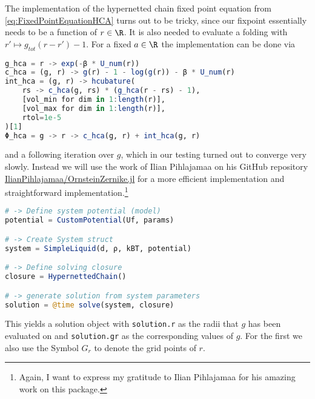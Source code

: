 The implementation of the hypernetted chain fixed point equation from \eqref{eq:FixedPointEquationHCA} turns out to be tricky, since our fixpoint essentially needs to be a function of $r\in\R$. It is also needed to evaluate a folding with $r'\mapsto g_{\textit{tot}}(r - r')-1$. For a fixed $a\in\R$ the implementation can be done via
\begin{mdframed}[backgroundcolor=black!4, topline=false, bottomline=false, rightline=false, leftline=false]
    \begin{lstlisting}[language=Julia,basicstyle=\small]
g_hca = r -> exp(-β * U_num(r))
c_hca = (g, r) -> g(r) - 1 - log(g(r)) - β * U_num(r)
int_hca = (g, r) -> hcubature(
    rs -> c_hca(g, rs) * (g_hca(r - rs) - 1),
    [vol_min for dim in 1:length(r)],
    [vol_max for dim in 1:length(r)],
    rtol=1e-5
)[1]
Φ_hca = g -> r -> c_hca(g, r) + int_hca(g, r)
    \end{lstlisting}
\end{mdframed}
and a following iteration over $g$, which in our testing turned out to converge very slowly. Instead we will use the work of Ilian Pihlajamaa on his GitHub repository \href{https://github.com/IlianPihlajamaa/OrnsteinZernike.jl}{IlianPihlajamaa/OrnsteinZernike.jl} for a more efficient implementation and straightforward implementation.\footnote{Again, I want to express my gratitude to Ilian Pihlajamaa for his amazing work on this package.}


\begin{mdframed}[backgroundcolor=black!4, topline=false, bottomline=false, rightline=false, leftline=false]
    \begin{lstlisting}[language=Julia,basicstyle=\small]
# -> Define system potential (model)
potential = CustomPotential(Uf, params)

# -> Create System struct
system = SimpleLiquid(d, ρ, kBT, potential)

# -> Define solving closure
closure = HypernettedChain()

# -> generate solution from system parameters
solution = @time solve(system, closure)
    \end{lstlisting}
\end{mdframed}
This yields a solution object with \texttt{solution.r} as the radii that $g$ has been evaluated on and \texttt{solution.gr} as the corresponding values of $g$. For the first we also use the Symbol $G_r$ to denote the grid points of $r$.



